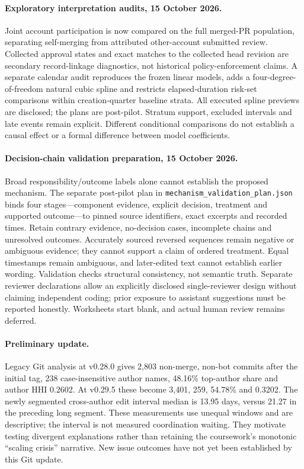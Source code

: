 \documentclass[11pt]{article}
\begin{document}
\paragraph{Exploratory interpretation audits, 15 October 2026.}
Joint account participation is now compared on the full merged-PR population,
separating self-merging from attributed other-account submitted review. Collected
approval states and exact matches to the collected head revision are secondary
record-linkage diagnostics, not historical policy-enforcement claims. A separate
calendar audit reproduces the frozen linear models, adds a four-degree-of-freedom
natural cubic spline and restricts elapsed-duration risk-set comparisons within
creation-quarter baseline strata. All executed spline previews are disclosed;
the plans are post-pilot. Stratum support, excluded intervals and late events
remain explicit. Different conditional comparisons do not establish a causal
effect or a formal difference between model coefficients.

\paragraph{Decision-chain validation preparation, 15 October 2026.}
Broad responsibility/outcome labels alone cannot establish the proposed mechanism.
The separate post-pilot plan in \texttt{mechanism\_validation\_plan.json} binds
four stages---component evidence, explicit decision, treatment and supported
outcome---to pinned source identifiers, exact excerpts and recorded times.
Retain contrary evidence, no-decision cases, incomplete chains and unresolved
outcomes. Accurately sourced reversed sequences remain negative or ambiguous
evidence; they cannot support a claim of ordered treatment. Equal timestamps
remain ambiguous, and later-edited text cannot establish earlier wording. Validation
checks structural consistency, not semantic truth. Separate reviewer declarations
allow an explicitly disclosed single-reviewer design without claiming independent
coding; prior exposure to assistant suggestions must be reported honestly.
Worksheets start blank, and actual human review remains deferred.

\paragraph{Preliminary update.} Legacy Git analysis at v0.28.0 gives 2,803
non-merge, non-bot commits after the initial tag, 238 case-insensitive author names,
48.16\% top-author share and author HHI 0.2602. At v0.29.5 these become 3,401,
259, 54.78\% and 0.3202. The newly segmented cross-author edit interval median
is 13.95 days, versus 21.27 in the preceding long segment. These measurements use
unequal windows and are descriptive; the interval is not measured coordination
waiting. They motivate testing divergent explanations rather than retaining the
coursework's monotonic ``scaling crisis'' narrative. New issue outcomes have not
yet been established by this Git update.
\end{document}
